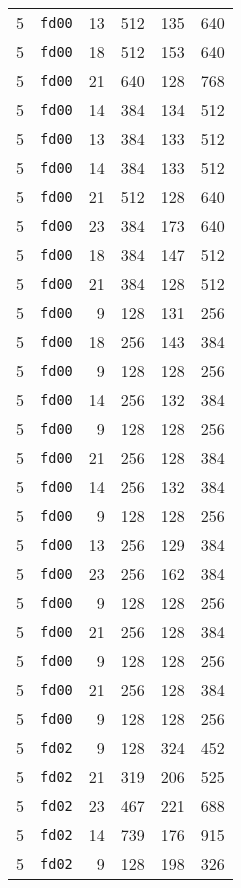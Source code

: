 \documentclass{article}
\begin{document}
\begin{table}[h!]
\begin{tabular}{llrrrl}
    5 & \texttt{fd00} & 13 & 512 & 135 & 640 \\
    5 & \texttt{fd00} & 18 & 512 & 153 & 640 \\
    5 & \texttt{fd00} & 21 & 640 & 128 & 768 \\
    5 & \texttt{fd00} & 14 & 384 & 134 & 512 \\
    5 & \texttt{fd00} & 13 & 384 & 133 & 512 \\
    5 & \texttt{fd00} & 14 & 384 & 133 & 512 \\
    5 & \texttt{fd00} & 21 & 512 & 128 & 640 \\
    5 & \texttt{fd00} & 23 & 384 & 173 & 640 \\
    5 & \texttt{fd00} & 18 & 384 & 147 & 512 \\
    5 & \texttt{fd00} & 21 & 384 & 128 & 512 \\
    5 & \texttt{fd00} & 9 & 128 & 131 & 256 \\
    5 & \texttt{fd00} & 18 & 256 & 143 & 384 \\
    5 & \texttt{fd00} & 9 & 128 & 128 & 256 \\
    5 & \texttt{fd00} & 14 & 256 & 132 & 384 \\
    5 & \texttt{fd00} & 9 & 128 & 128 & 256 \\
    5 & \texttt{fd00} & 21 & 256 & 128 & 384 \\
    5 & \texttt{fd00} & 14 & 256 & 132 & 384 \\
    5 & \texttt{fd00} & 9 & 128 & 128 & 256 \\
    5 & \texttt{fd00} & 13 & 256 & 129 & 384 \\
    5 & \texttt{fd00} & 23 & 256 & 162 & 384 \\
    5 & \texttt{fd00} & 9 & 128 & 128 & 256 \\
    5 & \texttt{fd00} & 21 & 256 & 128 & 384 \\
    5 & \texttt{fd00} & 9 & 128 & 128 & 256 \\
    5 & \texttt{fd00} & 21 & 256 & 128 & 384 \\
    5 & \texttt{fd00} & 9 & 128 & 128 & 256 \\
    5 & \texttt{fd02} & 9 & 128 & 324 & 452 \\
    5 & \texttt{fd02} & 21 & 319 & 206 & 525 \\
    5 & \texttt{fd02} & 23 & 467 & 221 & 688 \\
    5 & \texttt{fd02} & 14 & 739 & 176 & 915 \\
    5 & \texttt{fd02} & 9 & 128 & 198 & 326 \\

\end{tabular}
\end{table}
\end{document}
